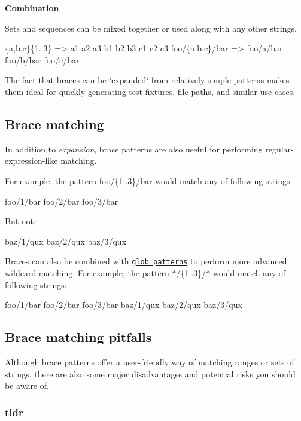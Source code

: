 {\bfseries Combination}

Sets and sequences can be mixed together or used along with any other strings.


\begin{DoxyCode}
\{a,b,c\}\{1..3\}   => a1 a2 a3 b1 b2 b3 c1 c2 c3
foo/\{a,b,c\}/bar => foo/a/bar foo/b/bar foo/c/bar
\end{DoxyCode}


The fact that braces can be \char`\"{}expanded\char`\"{} from relatively simple patterns makes them ideal for quickly generating test fixtures, file paths, and similar use cases.

\subsection*{Brace matching}

In addition to {\itshape expansion}, brace patterns are also useful for performing regular-\/expression-\/like matching.

For example, the pattern {\ttfamily foo/\{1..3\}/bar} would match any of following strings\+:


\begin{DoxyCode}
foo/1/bar
foo/2/bar
foo/3/bar
\end{DoxyCode}


But not\+:


\begin{DoxyCode}
baz/1/qux
baz/2/qux
baz/3/qux
\end{DoxyCode}


Braces can also be combined with \href{https://github.com/jonschlinkert/micromatch}{\tt glob patterns} to perform more advanced wildcard matching. For example, the pattern {\ttfamily $\ast$/\{1..3\}/$\ast$} would match any of following strings\+:


\begin{DoxyCode}
foo/1/bar
foo/2/bar
foo/3/bar
baz/1/qux
baz/2/qux
baz/3/qux
\end{DoxyCode}


\subsection*{Brace matching pitfalls}

Although brace patterns offer a user-\/friendly way of matching ranges or sets of strings, there are also some major disadvantages and potential risks you should be aware of.

\subsubsection*{tldr}


